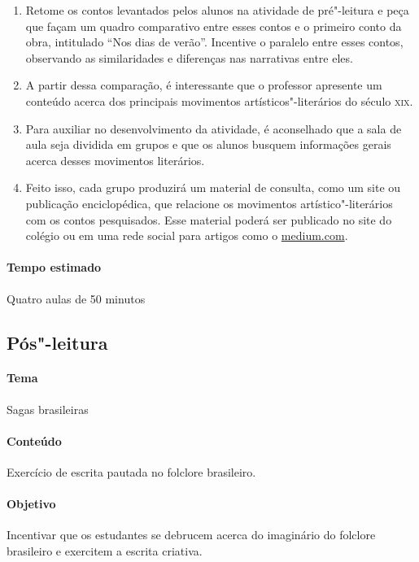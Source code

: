 \documentclass[12pt]{extarticle}
\begin{document}
\begin{enumerate}

\item  Retome os contos levantados pelos alunos na atividade de pré"-leitura e peça que
façam um quadro comparativo entre esses contos e o primeiro conto da obra,
intitulado ``Nos dias de verão''. Incentive o
paralelo entre esses contos, observando as
similaridades e diferenças nas narrativas entre eles.

\item A partir dessa comparação, é interessante que o professor apresente um conteúdo
acerca dos principais movimentos artísticos"-literários do século \textsc{xix}.

\item Para auxiliar no desenvolvimento da
atividade, é aconselhado que a sala de aula seja dividida em grupos e
que os alunos busquem informações gerais acerca desses movimentos literários.

\item Feito
isso, cada grupo produzirá um material de consulta, como um site ou publicação
enciclopédica, que relacione os movimentos artístico"-literários
com os contos pesquisados. Esse material poderá ser publicado no site do colégio ou 
em uma rede social para artigos como o \url{medium.com}.
\end{enumerate}

\paragraph{Tempo estimado} Quatro aulas de 50 minutos

\subsection{Pós"-leitura}

\paragraph{Tema} Sagas brasileiras

\paragraph{Conteúdo} Exercício de escrita pautada no folclore brasileiro. 

\paragraph{Objetivo} Incentivar que os estudantes se debrucem acerca do imaginário
do folclore brasileiro e exercitem a escrita criativa.
\end{document}
